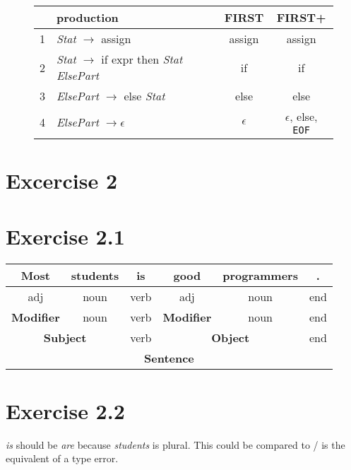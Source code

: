 \documentclass[11pt]{article} %
\begin{document}
\begin{figure}[H]
\begin{tabular}{|c|l|c|c|}\hline
  & production                                                               & \textbf{FIRST} & \textbf{FIRST+} \\\hline
1 & \textit{Stat} $\rightarrow$ assign                                       & assign         & assign \\\hline
2 & \textit{Stat} $\rightarrow$ if expr then \textit{Stat} \textit{ElsePart} & if             & if     \\\hline
3 & \textit{ElsePart} $\rightarrow$ else \textit{Stat}                       & else           & else   \\\hline
4 & \textit{ElsePart} $\rightarrow  \epsilon$                                & $\epsilon$     & $\epsilon$, else, \texttt{EOF} \\\hline
\end{tabular}
\end{figure}

\section*{Excercise 2}



\iffalse
\section*{Exercise 2.1}
\begin{tabular}{|c|c|c|c|c|c|}	\hline
Most 				& students 			& is 	& good 					& programmers 	& . 		\\\hline
adj 				& noun 				& verb 	& adj 					& noun 			& end 		\\\hline
\textbf{Modifier}	& noun				& verb	& \textbf{Modifier}		& noun			& end		\\\hline
\multicolumn{2}{|c|}{\textbf{Subject}}	& verb 	& \multicolumn{2}{c|}{\textbf{Object}}	& end		\\\hline
\multicolumn{6}{|c|}{\textbf{Sentence}}																\\\hline
\end{tabular}

\section*{Exercise 2.2}
\textit{is} should be \textit{are} because \textit{students} is plural. This could be compared to / is the equivalent
of a type error.
\end{document}

